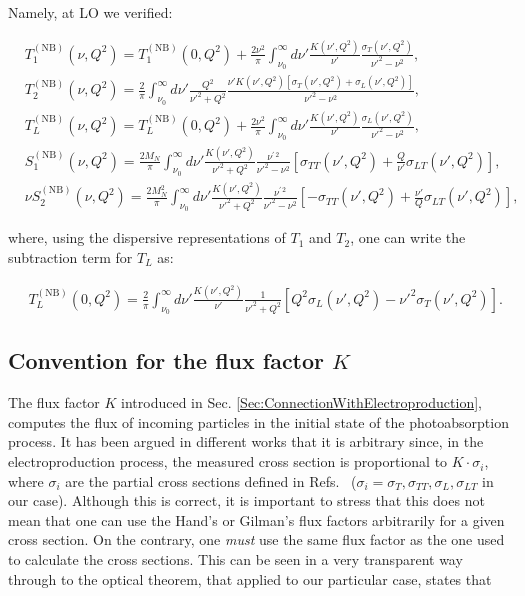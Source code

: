 \documentclass[prc,twocolumn,showpacs,preprintnumbers,amsmath,amssymb
,superscriptaddress,a4paper,nofootinbib
]{revtex4-1}
\begin{document}
Namely, at LO we verified:
\begin{widetext}
\begin{align}
&T^{(\mathrm{NB})}_1(\nu,Q^2)= T^{(\mathrm{NB})}_1(0,Q^2) + \frac{2 \nu^2}{ \pi}\int_{\nu_0}^{\infty}\!\! d\nu' \frac{K(\nu',Q^2)}{\nu'}\frac{\sigma_T(\nu',Q^2)}{\nu'^2-\nu^2} \label{Eq:T1disp}, \\
&T^{(\mathrm{NB})}_2(\nu,Q^2)= \frac{2}{\pi}\int_{\nu_0}^{\infty}\!\! d\nu'  \frac{ Q^2}{\nu'^2+Q^2} \frac{\nu' K(\nu',Q^2)[\sigma_T(\nu',Q^2)+\sigma_L(\nu',Q^2)]}{\nu'^2-\nu^2}\label{Eq:T2disp}, \\
&T^{(\mathrm{NB})}_L(\nu,Q^2)= T^{(\mathrm{NB})}_L(0,Q^2) + \frac{2 \nu^2}{ \pi}\int_{\nu_0}^{\infty}\!\! d\nu' \frac{K(\nu',Q^2)}{\nu'}\frac{\sigma_L(\nu',Q^2)}{\nu'^2-\nu^2} 
\label{Eq:TLdisp}, \\
&S^{(\mathrm{NB})}_1(\nu,Q^2)= \frac{2M_N}{\pi}\int_{\nu_0}^{\infty}\!\! d\nu'  \frac{ K(\nu',Q^2)}{\nu'^2+Q^2} \frac{ \nu^{\prime\, 2}}{\nu'^2-\nu^2} [\sigma_{TT}(\nu',Q^2)+\frac{Q}{\nu'}\sigma_{LT}(\nu',Q^2)]\label{Eq:S1disp},\\
&\nu S^{(\mathrm{NB})}_2(\nu,Q^2)= \frac{2 M_N^2}{\pi}\int_{\nu_0}^{\infty}\!\! d\nu'  \frac{ K(\nu',Q^2)}{\nu'^2+Q^2} \frac{ \nu^{\prime\, 2}}{\nu'^2-\nu^2} [-\sigma_{TT}(\nu',Q^2)+\frac{\nu'}{Q}\sigma_{LT}(\nu',Q^2)]\label{Eq:T2disp},
\end{align}

where, using the dispersive representations of $T_1$ and $T_2$, one can write the subtraction term for $T_L$ as:

\begin{align}
& T^{(\mathrm{NB})}_L(0,Q^2) = \frac{2}{\pi}\int_{\nu_0}^{\infty}\!\! d\nu' \frac{K(\nu',Q^2)}{\nu'} \frac{1}{\nu'^2+Q^2} [Q^2 \sigma_L(\nu',Q^2) - \nu'^2 \sigma_T(\nu',Q^2)] \label{Eq:TLdispSubt}.
\end{align}

\end{widetext}
\subsection{Convention for the flux factor $K$} \label{App:FluxFactor}

The flux factor $K$ introduced in Sec. \ref{Sec:ConnectionWithElectroproduction}, computes the flux of incoming particles in the initial state of the photoabsorption process. 
It has been argued in different works that it is arbitrary since, in the electroproduction process, the measured cross section is proportional to $K\cdot \sigma_i$, where $\sigma_i$ are the partial cross sections defined in Refs.~\cite{Drechsel:2000ct, Drechsel:2002ar} ($\sigma_i=\sigma_T,\sigma_{TT},\sigma_L,\sigma_{LT}$ in our case). 
Although this is correct, it is important to stress that this does not mean that one can use the Hand's \cite{Hand:1963bb}  or Gilman's \cite{Gilman:1967sn}  flux factors arbitrarily for a given cross section. On the contrary, one {\itshape must}  use the same flux factor as the one used to calculate the cross sections.   
 This can be seen in a very transparent way through to the optical theorem, that applied to our particular case, states that
\end{document}
